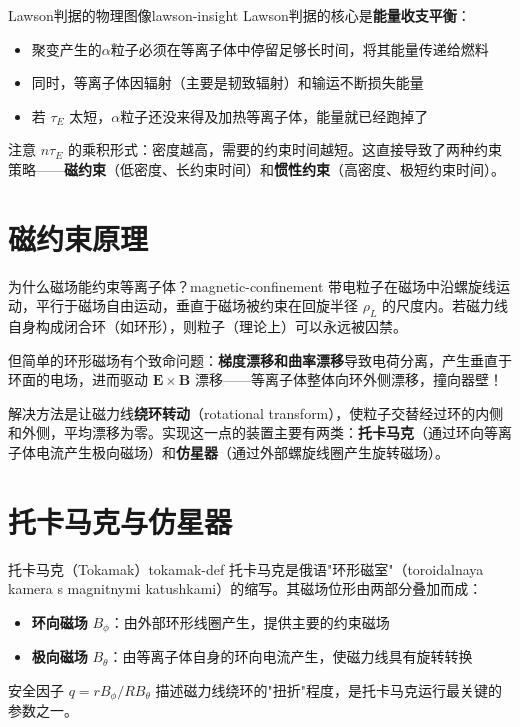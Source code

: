 \documentclass[12pt,a4paper,openany,oneside]{book}
\newcommand{\vect}[1]{\bm{#1}}
\newcommand{\difficulty}[1]{\marginnote{\textcolor{red}{\textbf{[#1]}}}}
\begin{document}
\begin{insight}{Lawson判据的物理图像}{lawson-insight}
Lawson判据的核心是\textbf{能量收支平衡}：
\begin{itemize}
\item 聚变产生的$\alpha$粒子必须在等离子体中停留足够长时间，将其能量传递给燃料
\item 同时，等离子体因辐射（主要是韧致辐射）和输运不断损失能量
\item 若 $\tau_E$ 太短，$\alpha$粒子还没来得及加热等离子体，能量就已经跑掉了
\end{itemize}

注意 $n\tau_E$ 的乘积形式：密度越高，需要的约束时间越短。这直接导致了两种约束策略——\textbf{磁约束}（低密度、长约束时间）和\textbf{惯性约束}（高密度、极短约束时间）。
\end{insight}

\section{磁约束原理}\difficulty{基础}

\begin{insight}{为什么磁场能约束等离子体？}{magnetic-confinement}
带电粒子在磁场中沿螺旋线运动，平行于磁场自由运动，垂直于磁场被约束在回旋半径 $\rho_L$ 的尺度内。若磁力线自身构成闭合环（如环形），则粒子（理论上）可以永远被囚禁。

但简单的环形磁场有个致命问题：\textbf{梯度漂移和曲率漂移}导致电荷分离，产生垂直于环面的电场，进而驱动 $\vect{E}\times\vect{B}$ 漂移——等离子体整体向环外侧漂移，撞向器壁！

解决方法是让磁力线\textbf{绕环转动}（rotational transform），使粒子交替经过环的内侧和外侧，平均漂移为零。实现这一点的装置主要有两类：\textbf{托卡马克}（通过环向等离子体电流产生极向磁场）和\textbf{仿星器}（通过外部螺旋线圈产生旋转磁场）。
\end{insight}

\section{托卡马克与仿星器}\difficulty{基础}

\begin{definition}{托卡马克（Tokamak）}{tokamak-def}
托卡马克是俄语"环形磁室"（toroidalnaya kamera s magnitnymi katushkami）的缩写。其磁场位形由两部分叠加而成：
\begin{itemize}
\item \textbf{环向磁场} $B_\phi$：由外部环形线圈产生，提供主要的约束磁场
\item \textbf{极向磁场} $B_\theta$：由等离子体自身的环向电流产生，使磁力线具有旋转转换
\end{itemize}
安全因子 $q = rB_\phi/RB_\theta$ 描述磁力线绕环的"扭折"程度，是托卡马克运行最关键的参数之一。
\end{definition}
\end{document}
